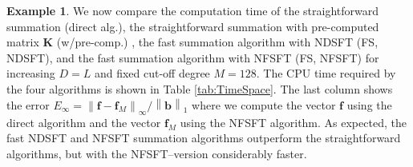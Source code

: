 \documentclass[11pt,a4paper,twoside,bibtotoc]{scrartcl}
\theoremstyle{plain}
\theoremstyle{definition}
\newtheorem{example}[theorem]{Example}
\theoremstyle{remark}
\numberwithin{equation}{section}
\numberwithin{table}{section}
\numberwithin{figure}{section}
\begin{document}


\begin{example}
We now compare the computation time of the straightforward summation
(direct alg.), the 
straightforward summation with pre-computed matrix $\mathbf{K}$
(w/pre-comp.) , the fast summation 
algorithm with NDSFT (FS, NDSFT), and the fast summation algorithm
with NFSFT (FS, NFSFT) for 
increasing $D=L$ and fixed cut-off degree $M=128$.
The CPU time required by the four algorithms is shown in Table
\ref{tab:TimeSpace}. The last column shows the error 
$E_{\infty} = \left\|\mathbf{f}-\mathbf{f}_M\right\|_{\infty}/\left\|\mathbf{b}\right\|_{1}$ 
where we compute the vector $\mathbf{f}$ using the direct algorithm and 
the vector $\mathbf{f}_{M}$ using the NFSFT algorithm.
As expected, the fast NDSFT and NFSFT summation algorithms outperform the 
straightforward algorithms, but with the NFSFT--version considerably
faster. 
\end{example}
\end{document}

